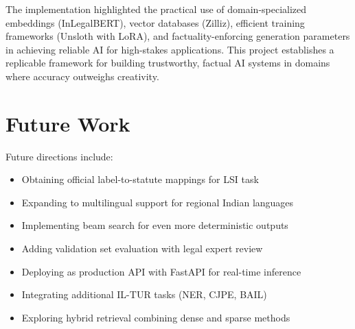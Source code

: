 \documentclass[11pt]{article}
\begin{document}
The implementation highlighted the practical use of domain-specialized embeddings (InLegalBERT), vector databases (Zilliz), efficient training frameworks (Unsloth with LoRA), and factuality-enforcing generation parameters in achieving reliable AI for high-stakes applications. This project establishes a replicable framework for building trustworthy, factual AI systems in domains where accuracy outweighs creativity.

\section{Future Work}

Future directions include:
\begin{itemize}
\item Obtaining official label-to-statute mappings for LSI task
\item Expanding to multilingual support for regional Indian languages
\item Implementing beam search for even more deterministic outputs
\item Adding validation set evaluation with legal expert review
\item Deploying as production API with FastAPI for real-time inference
\item Integrating additional IL-TUR tasks (NER, CJPE, BAIL)
\item Exploring hybrid retrieval combining dense and sparse methods
\end{itemize}
\end{document}
